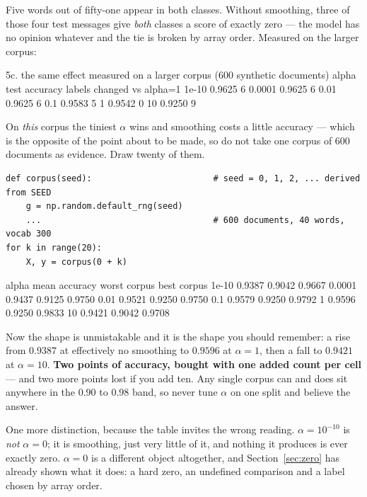 \documentclass[11pt]{article}
\begin{document}
Five words out of fifty-one appear in both classes. Without smoothing, three
of those four test messages give \emph{both} classes a score of exactly zero
--- the model has no opinion whatever and the tie is broken by array order.
Measured on the larger corpus:

\begin{codeout}
5c. the same effect measured on a larger corpus (600 synthetic documents)
        alpha   test accuracy   labels changed vs alpha=1
        1e-10          0.9625                           6
       0.0001          0.9625                           6
         0.01          0.9625                           6
          0.1          0.9583                           5
            1          0.9542                           0
           10          0.9250                           9
\end{codeout}

On \emph{this} corpus the tiniest $\alpha$ wins and smoothing costs a little
accuracy --- which is the opposite of the point about to be made, so do not
take one corpus of $600$ documents as evidence. Draw twenty of them.

\begin{lstlisting}
def corpus(seed):                        # seed = 0, 1, 2, ... derived from SEED
    g = np.random.default_rng(seed)
    ...                                  # 600 documents, 40 words, vocab 300
for k in range(20):
    X, y = corpus(0 + k)
\end{lstlisting}
\begin{codeout}
        alpha   mean accuracy   worst corpus   best corpus
        1e-10          0.9387         0.9042        0.9667
       0.0001          0.9437         0.9125        0.9750
         0.01          0.9521         0.9250        0.9750
          0.1          0.9579         0.9250        0.9792
            1          0.9596         0.9250        0.9833
           10          0.9421         0.9042        0.9708
\end{codeout}

Now the shape is unmistakable and it is the shape you should remember: a rise
from $0.9387$ at effectively no smoothing to $0.9596$ at $\alpha = 1$, then a
fall to $0.9421$ at $\alpha = 10$. \textbf{Two points of accuracy, bought
with one added count per cell} --- and two more points lost if you add ten.
Any single corpus can and does sit anywhere in the $0.90$ to $0.98$ band, so
never tune $\alpha$ on one split and believe the answer.

One more distinction, because the table invites the wrong reading.
$\alpha = 10^{-10}$ is \emph{not} $\alpha = 0$; it is smoothing, just very
little of it, and nothing it produces is ever exactly zero. $\alpha = 0$ is a
different object altogether, and Section~\ref{sec:zero} has already shown
what it does: a hard zero, an undefined comparison and a label chosen by array
order.
\end{document}
